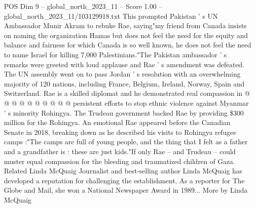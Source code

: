 \begin{textsample}{POS Dim 9 – global\_north\_2023\_11 – Score 1.00 – global\_north\_2023\_11/103129918.txt}
This prompted Pakistan ' s UN Ambassador Munir Akram to rebuke Rae, saying"my friend from Canada insists on naming the organization Hamas but does not feel the need for the equity and balance and fairness for which Canada is so well known, he does not feel the need to name Israel for killing 7,000 Palestinians."The Pakistan ambassador ' s remarks were greeted with loud applause and Rae ' s amendment was defeated.
The UN assembly went on to pass Jordan ' s resolution with an overwhelming majority of 120 nations, including France, Belgium, Ireland, Norway, Spain and Switzerland.
Rae is a skilled diplomat and he demonstrated real compassion in @ @ @ @ @ @ @ @ @ @ persistent efforts to stop ethnic violence against Myanmar ' s minority Rohingya.
The Trudeau government backed Rae by providing \$300 million for the Rohingya.
An emotional Rae appeared before the Canadian Senate in 2018, breaking down as he described his visits to Rohingya refugee camps :"The camps are full of young people, and the thing that I felt as a father and a grandfather is : these are just kids."If only Rae -- and Trudeau -- could muster equal compassion for the bleeding and traumatized children of Gaza.
Related Linda McQuaig Journalist and best-selling author Linda McQuaig has developed a reputation for challenging the establishment.
As a reporter for The Globe and Mail, she won a National Newspaper Award in 1989...
More by Linda McQuaig

\end{textsample}

